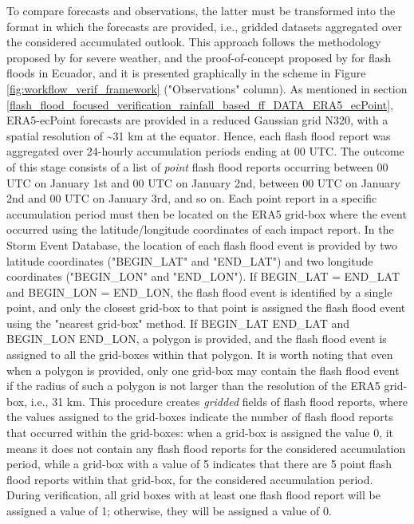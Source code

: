 To compare forecasts and observations, the latter must be transformed into the format in which the forecasts are provided, i.e., gridded datasets aggregated over the considered accumulated outlook. This approach follows the methodology proposed by \citet{Tsonevsky_2018} for severe weather, and the proof-of-concept proposed by \citet{Pillosu_2024} for flash floods in Ecuador, and it is presented graphically in the scheme in Figure \ref{fig:workflow_verif_framework} ("Observations" column). As mentioned in section \ref{flash_flood_focused_verification_rainfall_based_ff_DATA_ERA5_ecPoint}, ERA5-ecPoint forecasts are provided in a reduced Gaussian grid N320, with a spatial resolution of \sim31 km at the equator. Hence, each flash flood report was aggregated over 24-hourly accumulation periods ending at 00 UTC. The outcome of this stage consists of a list of \textit{point} flash flood reports occurring between 00 UTC on January 1st and 00 UTC on January 2nd, between 00 UTC on January 2nd and 00 UTC on January 3rd, and so on. Each point report in a specific accumulation period must then be located on the ERA5 grid-box where the event occurred using the latitude/longitude coordinates of each impact report. In the Storm Event Database, the location of each flash flood event is provided by two latitude coordinates ("BEGIN\_LAT" and "END\_LAT") and two longitude coordinates ("BEGIN\_LON" and "END\_LON"). If BEGIN\_LAT = END\_LAT and BEGIN\_LON = END\_LON, the flash flood event is identified by a single point, and only the closest grid-box to that point is assigned the flash flood event using the "nearest grid-box" method. If BEGIN\_LAT \ne END\_LAT and BEGIN\_LON \ne END\_LON, a polygon is provided, and the flash flood event is assigned to all the grid-boxes within that polygon. It is worth noting that even when a polygon is provided, only one grid-box may contain the flash flood event if the radius of such a polygon is not larger than the resolution of the ERA5 grid-box, i.e., 31 km. This procedure creates \textit{gridded} fields of flash flood reports, where the values assigned to the grid-boxes indicate the number of flash flood reports that occurred within the grid-boxes: when a grid-box is assigned the value 0, it means it does not contain any flash flood reports for the considered accumulation period, while a grid-box with a value of 5 indicates that there are 5 point flash flood reports within that grid-box, for the considered accumulation period. During verification, all grid boxes with at least one flash flood report will be assigned a value of 1; otherwise, they will be assigned a value of 0.

